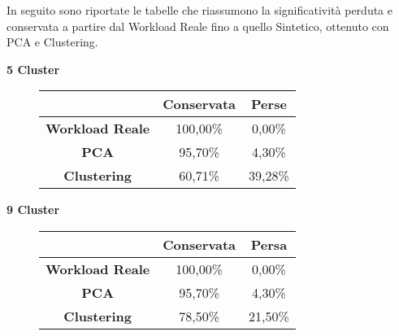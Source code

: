 \clearpage

In seguito sono riportate le tabelle che riassumono la significatività perduta e
conservata a partire dal Workload Reale fino a quello Sintetico, ottenuto con
PCA e Clustering.\\

\vspace{5 mm}
\begin{center}
  \textbf{5 Cluster}
\end{center}
\begin{figure}[!htbp]
  \centering
  \begin{tabular}{c|c|c}
   & \textbf{Conservata} & \textbf{Perse} \\
   \hline
   \textbf{Workload Reale} & 100,00\% &	0,00\% \\
   \hline
   \textbf{PCA} &	95,70\%	& 4,30\% \\
   \hline
   \textbf{Clustering} &	60,71\%	& 39,28\% \\
  \end{tabular}
\end{figure}

\vspace{5 mm}
\begin{center}
  \textbf{9 Cluster}
\end{center}
\begin{figure}[!htbp]
  \centering
  \begin{tabular}{c|c|c}
   & \textbf{Conservata} & \textbf{Persa} \\
   \hline
   \textbf{Workload Reale} & 100,00\% &	0,00\% \\
   \hline
   \textbf{PCA} &	95,70\%	& 4,30\% \\
   \hline
   \textbf{Clustering} &	78,50\%	& 21,50\% \\
  \end{tabular}
\end{figure}

\vspace{5 mm}


